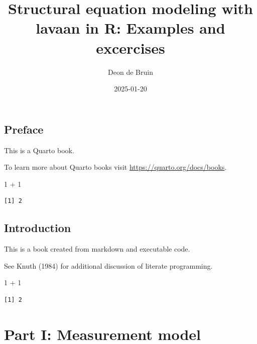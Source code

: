 \documentclass[
  letterpaper,
  DIV=11,
  numbers=noendperiod]{scrreprt}
\title{Structural equation modeling with lavaan in R: Examples and
excercises}
\author{Deon de Bruin}
\date{2025-01-20}
\newenvironment{Shaded}{\begin{snugshade}}{\end{snugshade}}
\newcommand{\DecValTok}[1]{\textcolor[rgb]{0.68,0.00,0.00}{#1}}
\newcommand{\SpecialCharTok}[1]{\textcolor[rgb]{0.37,0.37,0.37}{#1}}
\renewcommand*\contentsname{Table of contents}
\newcommand\contentsname{Table of contents}
\begin{document}
\maketitle

\renewcommand*\contentsname{Table of contents}
{
\hypersetup{linkcolor=}
\setcounter{tocdepth}{2}
\tableofcontents
}


\chapter*{Preface}\label{preface}


This is a Quarto book.

To learn more about Quarto books visit
\url{https://quarto.org/docs/books}.

\begin{Shaded}
\begin{Highlighting}[]
\DecValTok{1} \SpecialCharTok{+} \DecValTok{1}
\end{Highlighting}
\end{Shaded}

\begin{verbatim}
[1] 2
\end{verbatim}


\chapter{Introduction}\label{introduction}

This is a book created from markdown and executable code.

See Knuth (1984) for additional discussion of literate programming.

\begin{Shaded}
\begin{Highlighting}[]
\DecValTok{1} \SpecialCharTok{+} \DecValTok{1}
\end{Highlighting}
\end{Shaded}

\begin{verbatim}
[1] 2
\end{verbatim}

\part{Part I: Measurement model}
\end{document}
